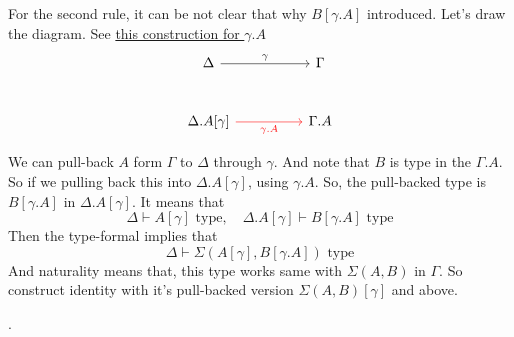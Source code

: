 \documentclass[12pt, a4paper, openany, twoside]{book}
\theoremstyle{definition}
\theoremstyle{remark}
\theoremstyle{plain}
\numberwithin{equation}{section}
\begin{document}
For the second rule, it can be not clear that why $B[\gamma.A]$ introduced. Let's draw the diagram. 
See \hyperlink{gamma.A}{this construction for $\gamma.A$}
\[
\begin{tikzcd}[column sep=huge, row sep=large]
    \Delta \arrow[r, "\gamma"] & \Gamma   \\
    \Delta.A[\gamma] \arrow[r, "\gamma.A"', red] & \Gamma.A
\end{tikzcd}
\]

We can pull-back $A$ form $\Gamma$ to $\Delta$ through $\gamma$. And note that $B$ is type in the $\Gamma.A$. So if we pulling back this into $\Delta.A[\gamma]$, 
using $\gamma.A$. So, the pull-backed type is $B[\gamma.A]$ in $\Delta.A[\gamma]$. It means that 
\[\Delta \vdash A[\gamma] \text{ type}, \quad \Delta.A[\gamma] \vdash B[\gamma.A] \text{ type}\]
Then the type-formal implies that 
\[\Delta \vdash \Sigma(A[\gamma], B[\gamma.A]) \text{ type}\]
And naturality means that, this type works same with $\Sigma(A, B)$ in $\Gamma$. So construct identity with 
it's pull-backed version $\Sigma(A, B)[\gamma]$ and above. 

\newpage  
.
\end{document}
